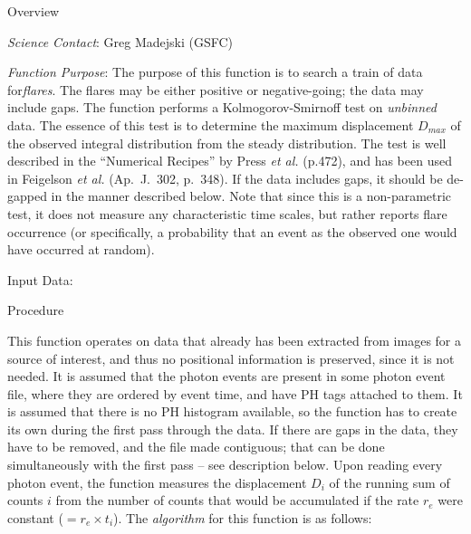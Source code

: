 %
\def\version{\it Rev. 1.0 - 5/25/88}
\def\chapter{\it Timing Analysis: Flare Monitor}

\@{Overview}

\noindent
{\it Science Contact}:  Greg Madejski (GSFC)

\noindent
{\it Function Purpose}:  The purpose of this function is to search a
train of data for{\it flares}.  The flares may be either
positive or negative-going; the data may include gaps.  The function
performs a Kolmogorov-Smirnoff test on {\it unbinned} data.  The
essence of this test is to determine the maximum displacement
$D_{max}$ of the observed integral distribution from the steady
distribution.  The test is well described in the ``Numerical Recipes''
by Press {\it et al.} (p.472), and has been used in Feigelson
{\it et al.} (Ap.~J.~302, p.~348).  If the data includes
gaps, it should be de-gapped in the manner described below.
Note that since this is a non-parametric test, it does not measure any
characteristic time scales, but rather reports flare occurrence (or
specifically, a probability that an event as the observed one would
have occurred at random).

\@{Input Data:}

\vskip 16pt


\vskip 24pt

\@{Procedure}

This function operates on data that already has been extracted from
images for a source of interest, and thus no positional information is
preserved, since it is not needed.  It is assumed that the photon
events are present in some photon event file, where they are ordered
by event time, and have PH tags attached to them.  It is assumed that there
is no PH histogram available, so the function has to create its own
during the first pass through the data.  If there are gaps in the data,
they have to be removed, and the file made contiguous; that
can be done simultaneously with the first pass -- see description below.  Upon
reading every photon event, the function measures the displacement
$D_i$ of the running sum of counts $i$ from the number of counts that
would be accumulated if the rate $r_e$ were constant ($=r_e \times
t_i$).  The {\it algorithm} for this function is as follows:

